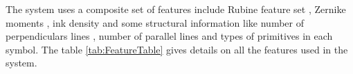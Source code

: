 The system uses a composite set of features include Rubine feature set \cite{gestureexample12}, Zernike moments \cite{HeloiseBeautification}, ink density \cite{GeometryAndDomain102} and some structural information like number of perpendiculars lines , number of parallel lines and types of primitives in each symbol. The table \ref{tab:FeatureTable} gives details on all the features used in the system.
%
%





